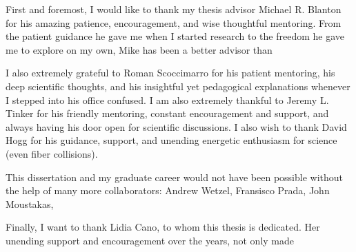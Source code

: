 First and foremost, I would like to thank my thesis advisor Michael R. Blanton 
for his amazing patience, encouragement, and wise thoughtful mentoring. 
From the patient guidance he gave me when I started research to the freedom 
he gave me to explore on my own, Mike has been a better advisor than 

I also extremely grateful to Roman Scoccimarro for his patient mentoring, his 
deep scientific thoughts, and his insightful yet pedagogical explanations whenever
I stepped into his office confused.
I am also extremely thankful to Jeremy L. Tinker for his friendly mentoring, constant 
encouragement and support, and always having his door open for scientific discussions.
I also wish to thank David Hogg for his guidance, support, and unending energetic 
enthusiasm for science (even fiber collisions).

This dissertation and my graduate career would not have been possible without the 
help of many more collaborators: Andrew Wetzel, Fransisco Prada, John Moustakas, 


Finally, I want to thank Lidia Cano, to whom this thesis is dedicated. Her 
unending support and encouragement over the years, not only made 

